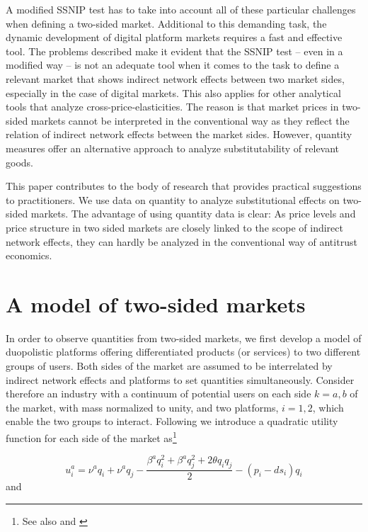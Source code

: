 \documentclass[12pt,a4paper]{scrreprt}
\begin{document}
A modified SSNIP test has to take into account all of these particular challenges when defining a two-sided market. Additional to this demanding task, the dynamic development of digital platform markets requires a fast and effective tool. The problems described make it evident that the SSNIP test – even in a modified way – is not an adequate tool when it comes to the task to define a relevant market that shows indirect network effects between two market sides, especially in the case of digital markets. This also applies for other analytical tools that analyze cross-price-elasticities. The reason is that market prices in two-sided markets cannot be interpreted in the conventional way as they reflect the relation of indirect network effects between the market sides. However, quantity measures offer an alternative approach to analyze substitutability of relevant goods. 

This paper contributes to the body of research that provides practical suggestions to practitioners. We use data on quantity to analyze substitutional effects on two-sided markets. The advantage of using quantity data is clear: As price levels and price structure in two sided markets are closely linked to the scope of indirect network effects, they can hardly be analyzed in the conventional way of antitrust economics. 

\chapter{A model of two-sided markets}\label{model}
In order to observe quantities from two-sided markets, we first develop a model of duopolistic platforms offering differentiated products (or services) to two different groups of users. Both sides of the market are assumed to be interrelated by indirect network effects and platforms to set quantities simultaneously. Consider therefore an industry with a continuum of potential users on each side $k = a,b$ of the market, with mass normalized to unity, and two platforms, $i = 1,2$, which enable the two groups to interact. Following \cite{shubik_market_1980} we introduce a quadratic utility function for each side of the market as\footnote{See also \cite{dixit_model_1979} and \cite{kind_competition_2006}}

\begin{equation}\label{4.1}
u_i^a = \nu^a q_i + \nu^a q_j-\frac{\beta^a q^2_i+ \beta^a q^2_j+ 2 \theta q_i q_j}{2}-(p_i-d s_i)q_i
\end{equation} and 
\end{document}
